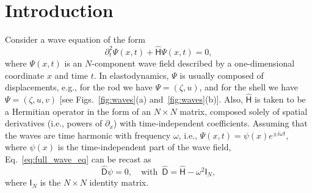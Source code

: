 




\section{Introduction}

Consider a wave equation of the form
%
\begin{equation}
  \partial_{t}^{2}\Psi(x,t) + \widehat{\mathsf{H}}\Psi(x,t) = 0,
  \label{eq:full_wave_eq}
\end{equation}
%
where $\Psi(x,t)$ is an $N$-component wave field described by a one-dimensional coordinate $x$ and time $t$.
In elastodynamics, $\Psi$ is usually composed of displacements, e.g., for the rod we have $\Psi = (\zeta, u)$, and for the shell we have $\Psi = (\zeta, u, v)$ [see Figs.~\ref{fig:waves}(a) and~\ref{fig:waves}(b)].
Also, $\widehat{\mathsf{H}}$ is taken to be a Hermitian operator in the form of an $N\times N$ matrix, composed solely of spatial derivatives (i.e., powers of $\partial_{x}$) with time-independent coefficients.
Assuming that the waves are time harmonic with frequency $\omega$, i.e., $\Psi(x, t) = \psi(x)e^{\pm i\omega t}$, where $\psi(x)$ is the time-independent part of the wave field, Eq.~\eqref{eq:full_wave_eq} can be recast as
%
\begin{equation}
  \widehat{\mathsf{D}}\psi = 0,\quad \text{with}\enspace \widehat{\mathsf{D}} = \widehat{\mathsf{H}} - \omega^{2}\mathsf{I}_{N},
  \label{eq:ev_problem}
\end{equation}
%
where $\mathsf{I}_{N}$ is the $N\times N$ identity matrix.

